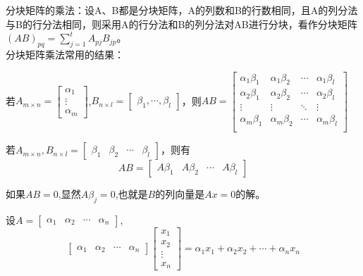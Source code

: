 \documentclass{article}
\begin{document}
分块矩阵的乘法：设A、B都是分块矩阵，A的列数和B的行数相同，且A的列分法与B的行分法相同，则采用A的行分法和B的列分法对AB进行分块，看作分块矩阵$(AB)_{pq}=\sum_{j=1}^{t}A_{pj}B_{jp}$。\\
分块矩阵乘法常用的结果：
\begin{asparaenum}[(1)]
\item 若$A_{m\times n}=
\begin{bmatrix}
  \alpha_{1}\\
  \vdots\\
  \alpha_{m}
\end{bmatrix}
$,$
B_{n\times l}=\begin{bmatrix}
                \beta_{1},\cdots,\beta_{l}
              \end{bmatrix}
$，则$
AB=
\begin{bmatrix}
  \alpha_{1}\beta_{1} & \alpha_{1}\beta_{2} & \cdots & \alpha_{1}\beta_{l}\\
  \alpha_{2}\beta_{1} & \alpha_{2}\beta_{2} & \cdots & \alpha_{2}\beta_{l}\\
   \vdots & \vdots & \ddots & \vdots\\
   \alpha_{m}\beta_{1} & \alpha_{m}\beta_{2} & \cdots & \alpha_{m}\beta_{l}\\
\end{bmatrix}
$
\item 若$A_{m\times n},B_{n\times l}=\begin{bmatrix}\beta_{1}&\beta_{2}&\cdots&\beta_{l}\end{bmatrix}$，则有
\begin{equation*}
  AB=
  \begin{bmatrix}
    A\beta_{1} & A\beta_{2} & \cdots &A\beta_{l}
  \end{bmatrix}
\end{equation*}
\item 如果$AB=0$,显然$A\beta_{j}=0$,也就是$B$的列向量是$Ax=0$的解。
\item 设$A=\begin{bmatrix}\alpha_{1}&\alpha_{2}&\cdots&\alpha_{n}\end{bmatrix}$,
\begin{equation*}
  \begin{bmatrix}
 \alpha_{1}&\alpha_{2}&\cdots&\alpha_{n}
  \end{bmatrix}
  \begin{bmatrix}
 x_{1}\\
 x_{2}\\
 \vdots\\
 x_{n}
  \end{bmatrix}=
  \alpha_{1}x_{1}+\alpha_{2}x_{2}+\cdots+\alpha_{n}x_{n}
\end{equation*}
\end{asparaenum}
\end{document}
